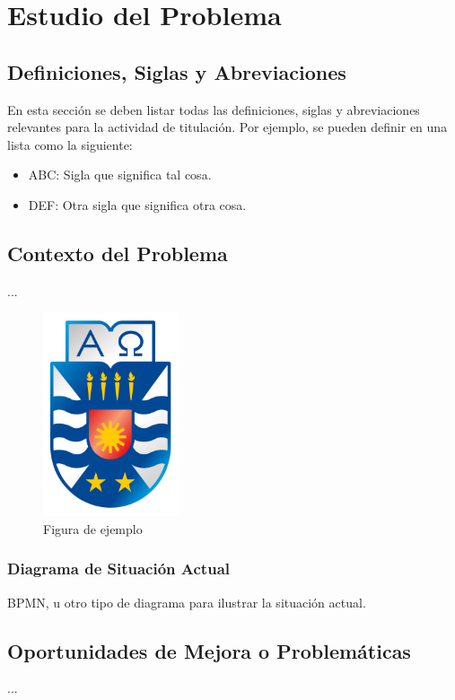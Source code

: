 \chapter{Estudio del Problema}

\section{Definiciones, Siglas y Abreviaciones}
En esta sección se deben listar todas las definiciones, siglas y abreviaciones relevantes para la actividad de titulación. Por ejemplo, se pueden definir en una lista como la siguiente:

\begin{itemize}
	\item ABC: Sigla que significa tal cosa.
	\item DEF: Otra sigla que significa otra cosa.
\end{itemize}

\section{Contexto del Problema}
...

\begin{figure}[H]
	\begin{center}
		\includegraphics[height=6cm]{img/logo.png}
	\end{center}
	\caption[Figura de ejemplo]{Figura de ejemplo}
	\label{fig:sample}
\end{figure}

\subsection{Diagrama de Situación Actual}
BPMN, u otro tipo de diagrama para ilustrar la situación actual.

\section{Oportunidades de Mejora o Problemáticas}
...

